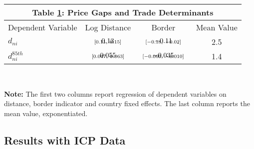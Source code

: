 \documentclass[12pt,dvips, ps2pdf]{article}
\renewcommand{\arraystretch}{1.1}
\begin{document}
\begin{table}[!t]
\footnotesize
{}
\renewcommand{\arraystretch}{2}
\setlength {\tabcolsep}{3.75mm}
\label{tb:data}
\begin{center}
\begin{tabular}[t]{l|c c | c}
\multicolumn{4}{c}{ \normalsize{\textbf{Table \ref{tb:data}: Price Gaps and Trade Determinants}}}
\\
\hline
\hline
Dependent Variable  &  Log Distance & Border & Mean Value\\
\hline
$d_{ni}$ & $\begin{array}{c} 0.13 \vspace{-.4cm} \\ \scriptstyle{[0.11, \   0.15]}\end{array}$  & $\begin{array}{c}-0.11 \vspace{-.4cm}\\ \scriptstyle{[-0.18, \   -0.02]}\end{array}$   & 2.5 \\
$d^{85th}_{ni}$  & $\begin{array}{c} 0.055 \vspace{-.4cm} \\ \scriptstyle{[0.047, \   0.063]}\end{array}$  & $\begin{array}{c}-0.035 \vspace{-.4cm}\\ \scriptstyle{[-0.060, \   -0.010]}\end{array}$  & 1.4\\
\hline
\end{tabular}
\\[0.75ex]
\parbox{4.8in}{\footnotesize  \textbf{Note:} The first two columns report regression of dependent variables on distance, border indicator and country fixed effects. The last column reports the mean value, exponentiated. }
\end{center}
\end{table}


\subsection{Results with ICP Data}
\end{document}
